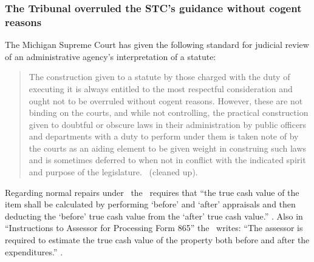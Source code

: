\documentclass[12pt,\documentclassflag]{michiganCourtOfAppealsBrief}
\begin{document}
\subsubsection{The Tribunal overruled the STC's guidance
  without cogent reasons}
  

The Michigan Supreme Court has given the following standard for judicial review of an administrative agency's interpretation of a statute:

\begin{quote}
The construction given to a statute by those charged with the duty of executing it is always entitled to the most respectful consideration and ought not to be overruled without cogent reasons. However, these are not binding on the courts, and while not controlling, the practical construction given to doubtful or obscure laws in their administration by public officers and departments with a duty to perform under them is taken note of by the courts as an aiding element to be given weight in construing such laws and is sometimes deferred to when not in conflict with the indicated spirit and purpose of the legislature. \ (cleaned up).
\end{quote}

Regarding normal repairs under \mathieuGast\ the \STC\ requires that ``the true cash value of the item shall be calculated by performing `before' and `after' appraisals and then deducting the `before' true cash value from the `after' true cash value.'' . Also in ``Instructions to Assessor for Processing Form 865'' the \STC\ writes:
 ``The assessor is required to estimate the true cash value of the property both before and after the expenditures.'' \stcform[2].



\end{document}
